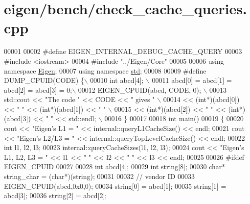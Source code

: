 \hypertarget{eigen_2bench_2check__cache__queries_8cpp_source}{}\section{eigen/bench/check\+\_\+cache\+\_\+queries.cpp}
\label{eigen_2bench_2check__cache__queries_8cpp_source}

\begin{DoxyCode}
00001 
00002 \textcolor{preprocessor}{#define EIGEN\_INTERNAL\_DEBUG\_CACHE\_QUERY}
00003 \textcolor{preprocessor}{#include <iostream>}
00004 \textcolor{preprocessor}{#include "../Eigen/Core"}
00005 
00006 \textcolor{keyword}{using namespace }\hyperlink{namespace_eigen}{Eigen};
00007 \textcolor{keyword}{using namespace }\hyperlink{namespacestd}{std};
00008 
00009 \textcolor{preprocessor}{#define DUMP\_CPUID(CODE) \{\(\backslash\)}
00010 \textcolor{preprocessor}{  int abcd[4]; \(\backslash\)}
00011 \textcolor{preprocessor}{  abcd[0] = abcd[1] = abcd[2] = abcd[3] = 0;\(\backslash\)}
00012 \textcolor{preprocessor}{  EIGEN\_CPUID(abcd, CODE, 0); \(\backslash\)}
00013 \textcolor{preprocessor}{  std::cout << "The code " << CODE << " gives " \(\backslash\)}
00014 \textcolor{preprocessor}{              << (int*)(abcd[0]) << " " << (int*)(abcd[1]) << " " \(\backslash\)}
00015 \textcolor{preprocessor}{              << (int*)(abcd[2]) << " " << (int*)(abcd[3]) << " " << std::endl; \(\backslash\)}
00016 \textcolor{preprocessor}{  \}}
00017   
00018 \textcolor{keywordtype}{int} main()
00019 \{
00020   cout << \textcolor{stringliteral}{"Eigen's L1    = "} << internal::queryL1CacheSize() << endl;
00021   cout << \textcolor{stringliteral}{"Eigen's L2/L3 = "} << internal::queryTopLevelCacheSize() << endl;
00022   \textcolor{keywordtype}{int} l1, l2, l3;
00023   internal::queryCacheSizes(l1, l2, l3);
00024   cout << \textcolor{stringliteral}{"Eigen's L1, L2, L3       = "} << l1 << \textcolor{stringliteral}{" "} << l2 << \textcolor{stringliteral}{" "} << l3 << endl;
00025   
00026 \textcolor{preprocessor}{  #ifdef EIGEN\_CPUID}
00027 
00028   \textcolor{keywordtype}{int} abcd[4];
00029   \textcolor{keywordtype}{int} \textcolor{keywordtype}{string}[8];
00030   \textcolor{keywordtype}{char}* string\_char = (\textcolor{keywordtype}{char}*)(\textcolor{keywordtype}{string});
00031 
00032   \textcolor{comment}{// vendor ID}
00033   EIGEN\_CPUID(abcd,0x0,0);
00034   \textcolor{keywordtype}{string}[0] = abcd[1];
00035   \textcolor{keywordtype}{string}[1] = abcd[3];
00036   \textcolor{keywordtype}{string}[2] = abcd[2];

\end{DoxyCode}
